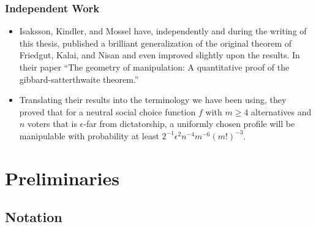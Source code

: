 \documentclass[aspectratio=169]{beamer}
\begin{document}
		\begin{frame}
			\frametitle{Independent Work}
			\begin{itemize}
				\item Isaksson, Kindler, and Mossel have, independently and during the writing of this thesis, published a brilliant generalization of the original theorem of Friedgut, Kalai, and Nisan and even improved slightly upon the results. In their paper ``The geometry of manipulation: A quantitative proof of the gibbard-satterthwaite theorem.''
				\item Translating their results into the terminology we have been using, they proved that for a neutral social choice function $f$ with $m \ge 4$ alternatives and $n$ voters that is $\epsilon$-far from dictatorship, a uniformly chosen profile will be manipulable with probability at least $2^{-1} \epsilon^2 n^{-4} m^{-6} (m!)^{-3}$.
			\end{itemize}

		\end{frame}


	\section{Preliminaries}
	\subsection{Notation}
\end{document}
